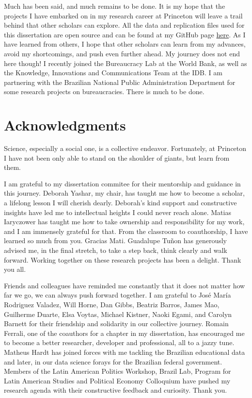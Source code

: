Much has been said, and much remains to be done. It is my hope that the projects I have embarked on in my research career at Princeton will leave a trail behind that other scholars can explore. All the data and replication files used for this dissertation are open source and can be found at my GitHub page \href{https://github.com/galileukim}{here}. As I have learned from others, I hope that other scholars can learn from my advances, avoid my shortcomings, and push even further ahead. My journey does not end here though! I recently joined the Bureaucracy Lab at the World Bank, as well as the Knowledge, Innovations and Communications Team at the IDB. I am partnering with the Brazilian National Public Administration Department for some research projects on bureaucracies. There is much to be done.

\newpage

\section*{Acknowledgments}

Science, especially a social one, is a collective endeavor. Fortunately, at Princeton I have not been only able to stand on the shoulder of giants, but learn from them. 

I am grateful to my dissertation commitee for their mentorship and guidance in this journey. Deborah Yashar, my chair, has taught me how to become a scholar, a lifelong lesson I will cherish dearly. Deborah's kind support and constructive insights have led me to intellectual heights I could never reach alone. Matias Iaryczower has taught me how to take ownership and responsibility for my work, and I am immensely grateful for that. From the classroom to coauthorship, I have learned so much from you. Gracias Mati. Guadalupe Tu\~{n}on has generously advised me, in the final stretch, to take a step back, think clearly and walk forward. Working together on these research projects has been a delight. Thank you all.

Friends and colleagues have reminded me constantly that it does not matter how far we go, we can always push forward together. I am grateful to Jos\'{e} Mar\'{i}a Rodriguez Valadez, Will Horne, Dan Gibbs, Beatriz Barros, James Mao, Guilherme Duarte, Elsa Voytas, Michael Kistner, Naoki Egami, and Carolyn Barnett for their friendship and solidarity in our collective journey. Romain Ferrali, one of the coauthors for a chapter in my dissertation, has encouraged me to become a better researcher, developer and professional, all to a jazzy tune. Matheus Hardt has joined forces with me tackling the Brazilian educational data and later, in our data science forays for the Brazilian federal government. Members of the Latin American Politics Workshop, Brazil Lab, Program for Latin American Studies and Political Economy Colloquium have pushed my research agenda with their constructive feedback and curiosity. Thank you.

